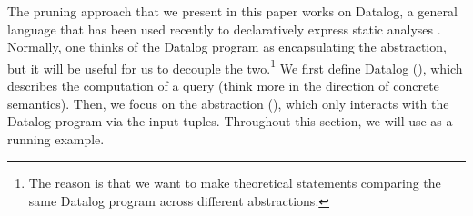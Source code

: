 
The pruning approach that we present in this paper works on Datalog, a general
language that has been used recently to declaratively express static analyses \cite{Whaley2007,bravenboer}.  Normally, one thinks of
the Datalog program as encapsulating the abstraction, but it will be useful for us
to decouple the two.\footnote{The reason is that we want to make theoretical
statements comparing the same Datalog program across different
abstractions.}  We first define Datalog (), which describes the
computation of a query (think more in the direction of concrete semantics).
Then, we focus on the abstraction (), which only interacts
with the Datalog program via the input tuples.
Throughout this section, we will use  as a running example.


